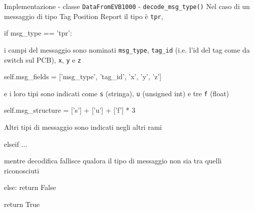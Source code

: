 
\begin{frame}[fragile, shrink=30]{Implementazione - classe \lstinline!DataFromEVB1000! - \lstinline!decode_msg_type()!}
  Nel caso di un messaggio di tipo Tag Position Report il tipo è \lstinline!tpr!,
  
  \begin{Python}
        if msg_type == 'tpr':
  \end{Python}
  
  i campi del messaggio sono nominati \lstinline!msg_type!, \lstinline!tag_id! (i.e. l'id
  del tag come da switch sul PCB), \lstinline!x!, \lstinline!y! e \lstinline!z!
  \begin{Python}
            self.msg_fields = ['msg_type', 'tag_id', 'x', 'y', 'z']
  \end{Python}
  e i loro tipi sono indicati come \lstinline!s! (stringa), \lstinline!u! (unsigned int)
  e tre \lstinline!f! (float)
  \begin{Python}
            self.msg_structure = ['s'] + ['u'] + ['f'] * 3
  \end{Python}
  Altri tipi di messaggio sono indicati negli altri rami
  \begin{Python}
        elseif ...
  \end{Python}
  mentre decodifica fallisce qualora il tipo di messaggio non sia tra quelli riconosciuti
  \begin{Python}
        else:
            return False

        return True
  \end{Python}
\end{frame}

